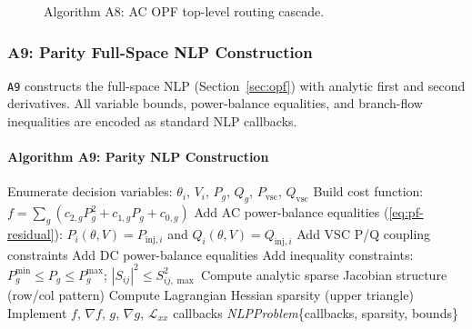 \begin{figure}[H]
\centering
{}
\caption{Algorithm A8: AC OPF top-level routing cascade.}
\label{fig:a8-flow}
\end{figure}

\subsubsection{A9: Parity Full-Space NLP Construction}
\label{algo:a9}

\texttt{A9} constructs the full-space NLP (Section~\ref{sec:opf})
with analytic first and second derivatives.  All variable bounds, power-balance
equalities, and branch-flow inequalities are encoded as standard NLP callbacks.

\paragraph{Algorithm A9: Parity NLP Construction}
\begin{algorithmic}[1]
  \State Enumerate decision variables: $\theta_i$, $V_i$, $P_g$, $Q_g$, $P_\mathrm{vsc}$, $Q_\mathrm{vsc}$
  \State Build cost function: $f = \sum_g (c_{2,g} P_g^2 + c_{1,g} P_g + c_{0,g})$
  \State Add AC power-balance equalities (\ref{eq:pf-residual}):
    $P_i(\theta,V) = P_{\mathrm{inj},i}$ and $Q_i(\theta,V) = Q_{\mathrm{inj},i}$
  \State Add VSC P/Q coupling constraints
  \State Add DC power-balance equalities
  \State Add inequality constraints: $P_g^{\min} \le P_g \le P_g^{\max}$;
    $|S_{ij}|^2 \le S_{ij,\max}^2$
  \State Compute analytic sparse Jacobian structure (row/col pattern)
  \State Compute Lagrangian Hessian sparsity (upper triangle)
  \State Implement $f$, $\nabla f$, $g$, $\nabla g$, $\mathcal{L}_{xx}$ callbacks
  \State \Return \textit{NLPProblem}\{callbacks, sparsity, bounds\}
\EndProcedure
\end{algorithmic}

